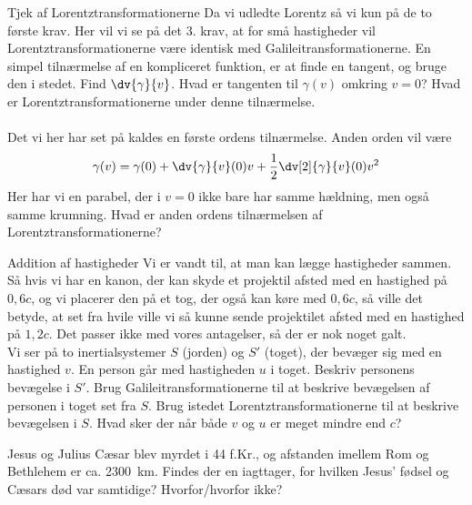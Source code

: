 \begin{opgave}{Tjek af Lorentztransformationerne}
Da vi udledte Lorentz så vi kun på de to første krav.
Her vil vi se på det 3. krav, at for små hastigheder vil Lorentztransformationerne være identisk med Galileitransformationerne.
En simpel tilnærmelse af en kompliceret funktion, er at finde en tangent, og bruge den i stedet.
\opg Find $\dv{\gamma}{v}$.
\opg Hvad er tangenten til $\gamma(v)$ omkring $v=0$?
\opg Hvad er Lorentztransformationerne under denne tilnærmelse.\\\\
%
Det vi her har set på kaldes en første ordens tilnærmelse.
Anden orden vil være
$$
\gamma(v)= \gamma(0)+\dv{\gamma}{v}(0)v+\frac{1}{2}\dv[2]{\gamma}{v}(0)v^2
$$
Her har vi en parabel, der i $v=0$ ikke bare har samme hældning, men også samme krumning.
\opg Hvad er anden ordens tilnærmelsen af Lorentztransformationerne?
\end{opgave}

\begin{opgave}{Addition af hastigheder}
Vi er vandt til, at man kan lægge hastigheder sammen. Så hvis vi har en kanon, der kan skyde et projektil afsted med en hastighed på $0,6c$, og vi placerer den på et tog, der også kan køre med $0,6c$, så ville det betyde, at set fra hvile ville vi så kunne sende projektilet afsted med en hastighed på $1,2c$. Det passer ikke med vores antagelser, så der er nok noget galt.\\
%
Vi ser på to inertialsystemer $S$ (jorden) og $S'$ (toget), der bevæger sig med en hastighed $v$.
\opg En person går med hastigheden $u$ i toget. Beskriv personens bevægelse i $S'$.
\opg Brug Galileitransformationerne til at beskrive bevægelsen af personen i toget set fra $S$.
\opg Brug istedet Lorentztransformationerne til at beskrive bevægelsen i $S$.
\opg Hvad sker der når både $v$ og $u$ er meget mindre end $c$?
\end{opgave}

\begin{opgave}{Jesus og Julius}
Cæsar blev myrdet i 44 f.Kr., og afstanden imellem Rom og Bethlehem er ca. \SI{2300}{km}.
\opg Findes der en iagttager, for hvilken Jesus' fødsel og Cæsars død var samtidige?
\opg Hvorfor/hvorfor ikke?
\end{opgave}

